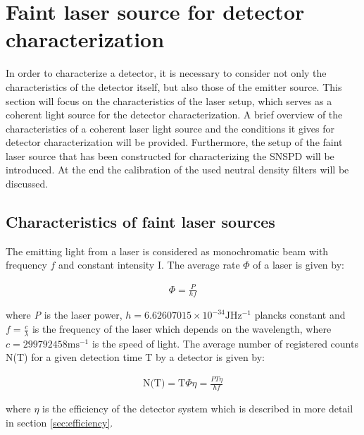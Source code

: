 
\chapter{Faint laser source for detector characterization}
\label{sec:SNSPD_setup}

In order to characterize a detector, it is necessary to consider not only the characteristics of the detector itself,
but also those of the emitter source.
This section will focus on the characteristics of the laser setup, which serves as a coherent light source for the detector
characterization.
A brief overview of the characteristics of a coherent laser light source and the conditions it gives
for detector characterization will be provided.
Furthermore, the setup of the faint laser source that has been constructed for characterizing the SNSPD will be introduced.
At the end the calibration of the used neutral density filters will be discussed.

\section{Characteristics of faint laser sources}\label{sec:characteristics_faint laser sources}


The emitting light from a laser is considered as monochromatic beam with frequency $f$
and constant intensity I. The average rate $\Phi$ of a laser is given by:

\begin{align}
    \Phi = \frac{P}{h f}
\end{align}

where \textit{P} is the laser power, $h = 6.62607015 \times 10^{-34} \si{\J \Hz^{-1}}$ plancks constant and $f = \frac{c}{\lambda}$ is the frequency of the laser which
depends on the wavelength, where $c = 299792458 \si{\m \s^{-1}}$ is the speed of light.
The average number of registered counts N(T) for a given detection time T by a detector is given by:

\begin{align}
    \text{N(T)} = \text{T} \Phi \eta= \frac{P T \eta}{h f}
\end{align}

where \textit{$\eta$} is the efficiency of the detector system which is described in more detail in section \ref{sec:efficiency}.


